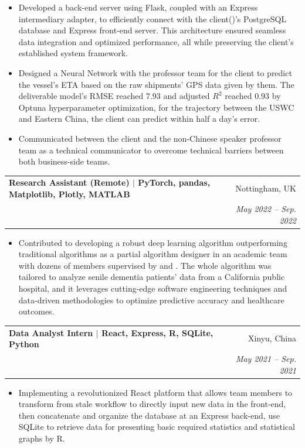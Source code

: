 \documentclass[a4paper,11pt]{article}
\makeatletter
\newcommand{\link}[1]{\color{myBlue}{#1}}
\newcommand{\skill}[1]{\small{\textnormal{$|$ {#1}}}}
\newcommand{\resumeItem}[1]{
  \item\small{
    {#1 \vspace{-2pt}}
  }
}
\newcommand{\resumeSubheading}[4]{
  \vspace{-2pt}\item
    \begin{tabular*}{0.97\textwidth}[t]{l@{\extracolsep{\fill}}r}
      \textbf{#1} & #2 \\
      \textit{\small#3} & \textit{\small #4} \\
    \end{tabular*}\vspace{-7pt}
}
\newcommand{\resumeSubSubheading}[2]{
    \item
    \begin{tabular*}{0.97\textwidth}{l@{\extracolsep{\fill}}r}
      \textit{\small#1} & \textit{\small #2} \\
    \end{tabular*}\vspace{-7pt}
}
\newcommand{\resumeSubHeadingListEnd}{\end{itemize}}
\newcommand{\resumeItemListStart}{\begin{itemize}}
\newcommand{\resumeItemListEnd}{\end{itemize}\vspace{-5pt}}
\makeatother
\begin{document}
      \resumeItemListStart
        \resumeItem{Developed a back-end server using Flask, coupled with an Express intermediary adapter, to efficiently connect with the client(\href{https://www.jusdausa.com/}{\link{Jusda}})'s PostgreSQL database and Express front-end server. This architecture ensured seamless data integration and optimized performance, all while preserving the client's established system framework.}
        \resumeItem{Designed a Neural Network with the professor team for the client to predict the vessel's ETA based on the raw shipments' GPS data given by them. The deliverable model's RMSE reached $7.93$ and adjusted $R^2$ reached $0.93$ by Optuna hyperparameter optimization, for the trajectory between the USWC and Eastern China, the client can predict within half a day's error.}
        \resumeItem{Communicated between the client and the non-Chinese speaker professor team as a technical communicator to overcome technical barriers between both business-side teams.}
      \resumeItemListEnd
      
    \resumeSubheading
      {Research Assistant (Remote) \skill{PyTorch, pandas, Matplotlib, Plotly, MATLAB}}{Nottingham, UK}
      {\href{https://minghsiehece.usc.edu/}{\link{USC, Ming Hsieh Department of Electrical and Computer Engineering}}}{May 2022 -- Sep. 2022}
      \resumeItemListStart
        \resumeItem{Contributed to developing a robust deep learning algorithm outperforming traditional algorithms as a partial algorithm designer in an academic team with dozens of members supervised by \href{https://minghsiehece.usc.edu/directory/faculty/profile/?lname=Bogdan&fname=Paul}{\link{Professor Paul Bogdan}} and \href{https://scholar.google.com/citations?user=M552LEAAAAAJ&hl=en}{\link{Chenzhong Yin}}. The whole algorithm was tailored to analyze senile dementia patients' data from a California public hospital, and it leverages cutting-edge software engineering techniques and data-driven methodologies to optimize predictive accuracy and healthcare outcomes.}
    \resumeItemListEnd
        
    \resumeSubheading
      {Data Analyst Intern \skill{React, Express, R, SQLite, Python}}{Xinyu, China}
      {\href{http://www.sgcc.com.cn/html/sgcc_en/index.shtml}{\link{State Grid Jiangxi Electric Power Co., LTD. (Xinyu Power Supply Branch)}}}{May 2021 -- Sep. 2021}
      \resumeItemListStart
        \resumeItem{Implementing a revolutionized React platform that allows team members to transform from stale workflow to directly input new data in the front-end, then concatenate and organize the database at an Express back-end, use SQLite to retrieve data for presenting basic required statistics and statistical graphs by R.}
      \resumeItemListEnd
\end{document}
